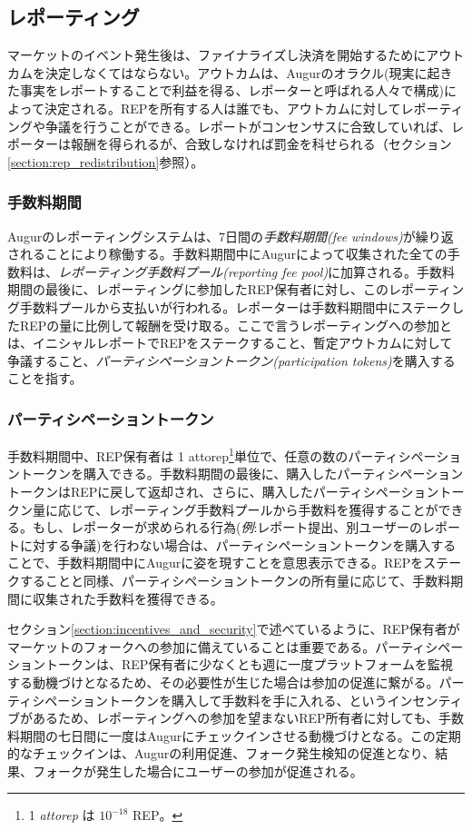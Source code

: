 \documentclass[floatfix,reprint,nofootinbib,amsmath,amssymb,epsfig,pre,floats,letterpaper,groupedaffiliation]{revtex4-1}
\theoremstyle{definition}
\theoremstyle{definition}
\theoremstyle{definition}
\begin{document}
\subsection{レポーティング}\label{section:reporting}

マーケットのイベント発生後は、ファイナライズし決済を開始するためにアウトカムを決定しなくてはならない。アウトカムは、Augurのオラクル(現実に起きた事実をレポートすることで利益を得る、レポーターと呼ばれる人々で構成)によって決定される。REPを所有する人は誰でも、アウトカムに対してレポーティングや争議を行うことができる。レポートがコンセンサスに合致していれば、レポーターは報酬を得られるが、合致しなければ罰金を科せられる（セクション\ref{section:rep_redistribution}参照）。

\subsubsection{手数料期間}

Augurのレポーティングシステムは、7日間の\textit{手数料期間(fee windows)}が繰り返されることにより稼働する。手数料期間中にAugurによって収集された全ての手数料は、\textit{レポーティング手数料プール(reporting fee pool)}に加算される。手数料期間の最後に、レポーティングに参加したREP保有者に対し、このレポーティング手数料プールから支払いが行われる。レポーターは手数料期間中にステークしたREPの量に比例して報酬を受け取る。ここで言うレポーティングへの参加とは、イニシャルレポートでREPをステークすること、暫定アウトカムに対して争議すること、\textit{パーティシペーショントークン(participation tokens)}を購入することを指す。

\subsubsection{パーティシペーショントークン}

手数料期間中、REP保有者は 1 attorep\footnote{1 \textit{attorep} は $10^{-18}$ REP。}単位で、任意の数のパーティシペーショントークンを購入できる。手数料期間の最後に、購入したパーティシペーショントークンはREPに戻して返却され、さらに、購入したパーティシペーショントークン量に応じて、レポーティング手数料プールから手数料を獲得することができる。もし、レポーターが求められる行為(\textit{例}:レポート提出、別ユーザーのレポートに対する争議)を行わない場合は、パーティシペーショントークンを購入することで、手数料期間中にAugurに姿を現すことを意思表示できる。REPをステークすることと同様、パーティシペーショントークンの所有量に応じて、手数料期間に収集された手数料を獲得できる。

セクション\ref{section:incentives_and_security}で述べているように、REP保有者がマーケットのフォークへの参加に備えていることは重要である。パーティシペーショントークンは、REP保有者に少なくとも週に一度プラットフォームを監視する動機づけとなるため、その必要性が生じた場合は参加の促進に繋がる。パーティシペーショントークンを購入して手数料を手に入れる、というインセンティブがあるため、レポーティングへの参加を望まないREP所有者に対しても、手数料期間の七日間に一度はAugurにチェックインさせる動機づけとなる。この定期的なチェックインは、Augurの利用促進、フォーク発生検知の促進となり、結果、フォークが発生した場合にユーザーの参加が促進される。
\end{document}
